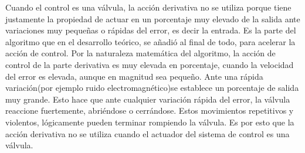 Cuando el control es una válvula, la acción derivativa no se utiliza porque tiene justamente la propiedad de actuar en un porcentaje muy elevado de la salida ante variaciones muy pequeñas o rápidas  del error, es decir la entrada. Es la parte del algoritmo que en el desarrollo teórico, se añadió al final de todo, para acelerar la acción de control. Por la naturaleza matemática del algoritmo, la acción de control de la parte derivativa es muy elevada en porcentaje, cuando la velocidad del error es elevada, aunque en magnitud sea pequeño. Ante una rápida variación(por ejemplo ruido electromagnético)se establece un porcentaje de salida muy grande. Esto hace que ante cualquier variación rápida del error, la válvula reaccione fuertemente, abriéndose o cerrándose. Estos movimientos repetitivos y violentos, lógicamente pueden terminar rompiendo la válvula. Es por esto que la acción derivativa no se utiliza cuando el actuador del sistema de control es una válvula.
%
%
%
%
%
%	
%		
%
%		
%		
%		
%		
%
%
%
